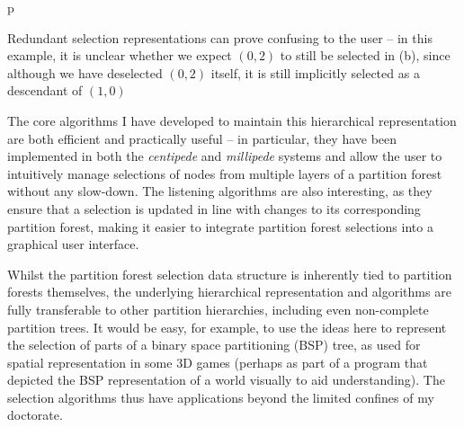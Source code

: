 \begin{stusubfig}{p}
	\hspace{4mm}%
\caption{Redundant selection representations can prove confusing to the user -- in this example, it is unclear whether we expect $(0,2)$ to still be selected in (b), since although we have deselected $(0,2)$ itself, it is still implicitly selected as a descendant of $(1,0)$}
\label{fig:criticalassessment-selection-redundancy}
\end{stusubfig}

The core algorithms I have developed to maintain this hierarchical representation are both efficient and practically useful -- in particular, they have been implemented in both the \emph{centipede} and \emph{millipede} systems and allow the user to intuitively manage selections of nodes from multiple layers of a partition forest without any slow-down. The listening algorithms are also interesting, as they ensure that a selection is updated in line with changes to its corresponding partition forest, making it easier to integrate partition forest selections into a graphical user interface.

Whilst the partition forest selection data structure is inherently tied to partition forests themselves, the underlying hierarchical representation and algorithms are fully transferable to other partition hierarchies, including even non-complete partition trees. It would be easy, for example, to use the ideas here to represent the selection of parts of a binary space partitioning (BSP) tree, as used for spatial representation in some 3D games (perhaps as part of a program that depicted the BSP representation of a world visually to aid understanding). The selection algorithms thus have applications beyond the limited confines of my doctorate.


